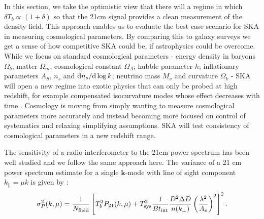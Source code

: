 \documentclass{PoS}
\newcommand{\ud}{{\rm d}}
\begin{document}
In this section, we take the optimistic view that there will a regime in which $\delta T_b\propto(1+\delta)$ so that the 21cm signal provides a clean measurement of the density field. This approach enables us to evaluate the best case scenario for SKA in measuring cosmological parameters. By comparing this to galaxy surveys we get a sense of how competitive SKA could be, if astrophysics could be overcome.
While we focus on standard cosmological parameters - energy density in baryons $\Omega_b$, matter $\Omega_m$, cosmological constant $\Omega_\Lambda$; hubble parameter $h$; inflationary parameters $A_S$, $n_s$ and $\ud n_s/\ud\log k$; neutrino mass $M_\nu$ and curvature $\Omega_k$ - SKA will open a new regime into exotic physics that can only be probed at high redshift, for example compensated isocurvature modes whose effect decreases with time \citep{2009PhRvD..80f3535G}. Cosmology is moving from simply wanting to measure cosmological parameters more accurately and instead becoming more focused on control of systematics and relaxing simplifying assumptions. SKA will test consistency of cosmological parameters in a new redshift range.

The sensitivity of a radio interferometer to the 21cm power spectrum has been well studied \cite[e.g.][]{bowman2006, 2006ApJ...653..815M,2008PhRvD..78b3529M} and we follow the same approach here. The variance of a 21 cm power spectrum estimate for a single
$\mathbf{k}$-mode with line of sight component $k_{||}=\mu k$ is given by \citep{2008ApJ...680..962L}:
\begin{equation}
\sigma_P^2(k,\mu)= \frac{1}{N_{\rm field}}\left[\bar{T}_b^2P_{21}(k,\mu)+T_{\rm sys}^2\frac{1}{B t_{\rm int}}\frac{D^2\Delta D}{n(k_\perp)}\left(\frac{\lambda^2}{A_e}\right)^2\right]^2.
\end{equation}
\end{document}
